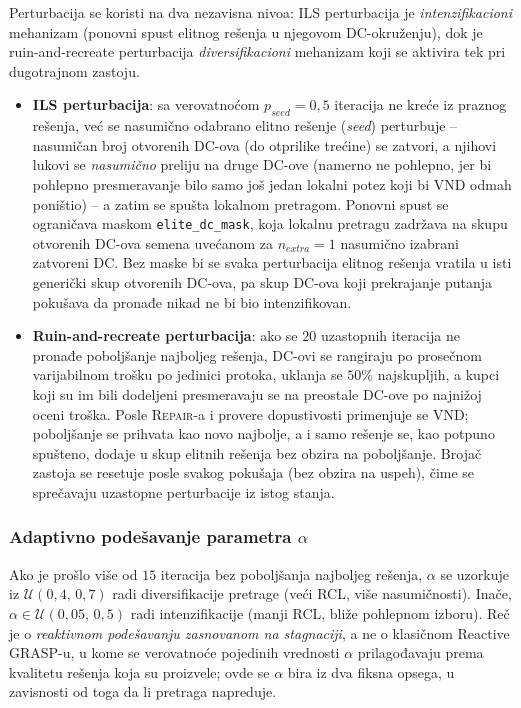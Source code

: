 \documentclass[12pt,a4paper]{article}
\begin{document}
Perturbacija se koristi na dva nezavisna nivoa: ILS perturbacija je
\textit{intenzifikacioni} mehanizam (ponovni spust elitnog rešenja u njegovom
DC-okruženju), dok je ruin-and-recreate perturbacija \textit{diversifikacioni}
mehanizam koji se aktivira tek pri dugotrajnom zastoju.
\begin{itemize}
  \item \textbf{ILS perturbacija}: sa verovatnoćom $p_{seed} = 0{,}5$ iteracija
    ne kreće iz praznog rešenja, već se nasumično odabrano elitno rešenje
    (\textit{seed}) perturbuje -- nasumičan broj otvorenih DC-ova (do otprilike
    trećine) se zatvori, a njihovi lukovi se \textit{nasumično} preliju na druge
    DC-ove (namerno ne pohlepno, jer bi pohlepno presmeravanje bilo samo još
    jedan lokalni potez koji bi VND odmah poništio) -- a zatim se spušta
    lokalnom pretragom. Ponovni spust se ograničava maskom
    \texttt{elite\_dc\_mask}, koja lokalnu pretragu zadržava na skupu otvorenih
    DC-ova semena uvećanom za $n_{extra} = 1$ nasumično izabrani zatvoreni DC.
    Bez maske bi se svaka perturbacija elitnog rešenja vratila u isti generički
    skup otvorenih DC-ova, pa skup DC-ova koji prekrajanje putanja pokušava da
    pronađe nikad ne bi bio intenzifikovan.
  \item \textbf{Ruin-and-recreate perturbacija}: ako se $20$ uzastopnih
    iteracija ne pronađe poboljšanje najboljeg rešenja, DC-ovi se rangiraju po
    prosečnom varijabilnom trošku po jedinici protoka, uklanja se $50\%$
    najskupljih, a kupci koji su im bili dodeljeni presmeravaju se na preostale
    DC-ove po najnižoj oceni troška. Posle \textsc{Repair}-a i provere
    dopustivosti primenjuje se VND; poboljšanje se prihvata kao novo najbolje,
    a i samo rešenje se, kao potpuno spušteno, dodaje u skup elitnih rešenja
    bez obzira na poboljšanje. Brojač zastoja se resetuje posle svakog pokušaja
    (bez obzira na uspeh), čime se sprečavaju uzastopne perturbacije iz istog
    stanja.
\end{itemize}

\subsubsection{Adaptivno podešavanje parametra $\alpha$}

Ako je prošlo više od $15$ iteracija bez poboljšanja najboljeg rešenja,
$\alpha$ se uzorkuje iz $\mathcal{U}(0{,}4,\, 0{,}7)$ radi diversifikacije
pretrage (veći RCL, više nasumičnosti). Inače, $\alpha \in
\mathcal{U}(0{,}05,\, 0{,}5)$ radi intenzifikacije (manji RCL, bliže pohlepnom
izboru). Reč je o \emph{reaktivnom podešavanju zasnovanom na stagnaciji}, a ne
o klasičnom Reactive GRASP-u, u kome se verovatnoće pojedinih vrednosti
$\alpha$ prilagođavaju prema kvalitetu rešenja koja su proizvele; ovde se
$\alpha$ bira iz dva fiksna opsega, u zavisnosti od toga da li pretraga
napreduje.
\end{document}
